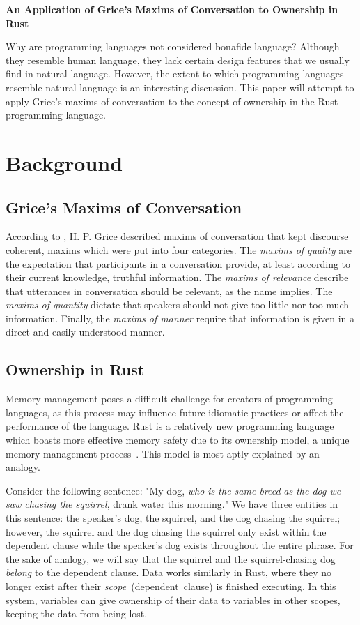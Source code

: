 \documentclass[12pt]{article}
\begin{document}
    
    \setcounter{page}{2}
    {\centering
      \textbf{An Application of Grice's Maxims of Conversation to Ownership 
        in Rust}\par
    }
    Why are programming languages not considered bonafide language? Although
    they resemble human language, they lack certain design features that we
    usually find in natural language. However, the extent to which programming
    languages resemble natural language is an interesting discussion. This
    paper will attempt to apply Grice's maxims of conversation to the concept
    of ownership in the Rust programming language.
    \section*{Background}
    \subsection*{Grice's Maxims of Conversation}
    According to \textcite[pp.\@~280-283]{dawson_phelan_2016}, H. P. Grice
    described maxims of conversation that kept discourse coherent, maxims
    which were put into four categories. The \textit{maxims of quality} are
    the expectation that participants in a conversation provide, at least 
    according to their current knowledge, truthful information. The 
    \textit{maxims of relevance} describe that utterances in conversation 
    should be relevant, as the name implies. The \textit{maxims of quantity}
    dictate that speakers should not give too little nor too much
    information. Finally, the \textit{maxims of manner} require that
    information is given in a direct and easily understood manner.
    \subsection*{Ownership in Rust}
    Memory management poses a difficult challenge for creators of programming
    languages, as this process may influence future idiomatic practices or
    affect the performance of the language. Rust is a relatively new
    programming language which boasts more effective memory safety due to its
    ownership model, a unique memory management 
    process~\autocite{rust_website}.  This model is most aptly explained by an
    analogy.
    
    Consider the following sentence: "My dog, \textit{who is the same breed}
    \textit{as the dog we saw chasing the squirrel}, drank water this
    morning." We have three entities in this sentence: the speaker's dog,
    the squirrel, and the dog chasing the squirrel; however, the squirrel and
    the dog chasing the squirrel only exist within the dependent clause while
    the speaker's dog exists throughout the entire phrase. For the sake of
    analogy, we will say that the squirrel and the squirrel-chasing dog 
    \textit{belong} to the dependent clause. Data works similarly in Rust,
    where they no longer exist after their \textit{scope}~(dependent~clause)
    is finished executing. In this system, variables can give ownership of
    their data to variables in other scopes, keeping the data from being
    lost.
\end{document}
